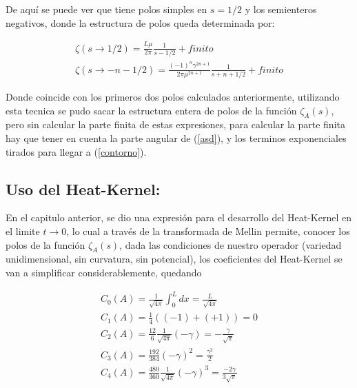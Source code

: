 De aquí se puede ver que tiene polos simples en $s=1/2$ y los semienteros negativos, donde la estructura de polos queda determinada por:

\begin{equation}
\begin{array}{c}

\zeta(s \rightarrow 1/2) = \frac{L \mu }{2 \pi} \frac{1}{s-1/2} + finito\\
\zeta (s \rightarrow -n - 1/2)  = \frac{ (-1) ^n \gamma ^{2n+1}  }{2 \pi \mu ^{2n + 1}} \frac{1}{s + n + 1/2} + finito

\end{array}
\end{equation}


Donde coincide con los primeros dos polos calculados anteriormente, utilizando esta tecnica se pudo sacar la estructura entera de polos de la función $\zeta _A (s) $, pero sin calcular la parte finita de estas expresiones, para calcular la parte finita hay que tener en cuenta la parte angular de (\ref{asd}), y los terminos exponenciales tirados para llegar a (\ref{contorno}).


\subsection{Uso del Heat-Kernel:}

En el capitulo anterior, se dio una expresión para el desarrollo del Heat-Kernel en el limite $t \rightarrow 0$, lo cual a través de la transformada de Mellin permite, conocer los polos de la función $\zeta _A (s)$, dada las condiciones de nuestro operador (variedad unidimensional, sin curvatura, sin potencial), los coeficientes del Heat-Kernel se van a simplificar considerablemente, quedando

\begin{equation}
\begin{array}{c}
C _0 (A) = \frac{1}{\sqrt{4 \pi}} \int _{0} ^{L} dx = \frac{L}{\sqrt{4 \pi}} \\
C _1 (A) = \frac{1}{4} \left( (-1) + (+1) \right) = 0 \\
C _2 (A) = \frac{12}{6} \frac{1}{\sqrt{4 \pi }} \left(  - \gamma \right) = - \frac{\gamma}{\sqrt{\pi}} \\
C _3 (A) = \frac{192}{384}  (- \gamma ) ^2 = \frac{\gamma ^2}{2} \\
C _4 (A) = \frac{480}{360} \frac{1}{\sqrt{4 \pi}} (- \gamma) ^3 = \frac{-2 \gamma}{3 \sqrt{\pi}}

\end{array}
\end{equation}

